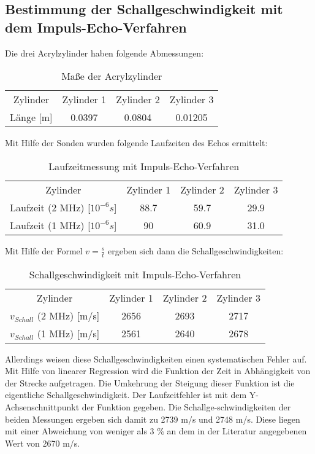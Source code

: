 \documentclass[11pt,ngerman,a4paper]{article}
\begin{document}
\subsection{Bestimmung der Schallgeschwindigkeit mit dem Impuls-Echo-Verfahren}
Die drei Acrylzylinder haben folgende Abmessungen:
 \begin{table}[h]
\centering
 \begin{tabular}{|c||c|c|c|}
 Zylinder & Zylinder 1 & Zylinder 2 & Zylinder 3 \\
  Länge [m] & 0.0397 & 0.0804 & 0.01205 \\
 \end{tabular}
\caption{Maße der Acrylzylinder}
\end{table}
\newline Mit Hilfe der Sonden wurden folgende Laufzeiten des Echos ermittelt:
 \begin{table}[h]
\centering
 \begin{tabular}{|c||c|c|c|}
 Zylinder & Zylinder 1 & Zylinder 2 & Zylinder 3 \\
 Laufzeit (2 MHz) [$10^{-6}s$] & 88.7 & 59.7 & 29.9 \\
 Laufzeit (1 MHz) [$10^{-6}s$] & 90  & 60.9 & 31.0 \\
 \end{tabular}
\caption{Laufzeitmessung mit Impuls-Echo-Verfahren}
\end{table}
\newline
Mit Hilfe der Formel $v=\frac{s}{t}$ ergeben sich dann die Schallgeschwindigkeiten:
\begin{table}[h]
\centering
 \begin{tabular}{|c||c|c|c|}
 Zylinder & Zylinder 1 & Zylinder 2 & Zylinder 3 \\
 $v_{Schall}$ (2 MHz) [m/s] & 2656 & 2693 & 2717 \\
 $v_{Schall}$ (1 MHz) [m/s] & 2561  & 2640 & 2678 \\
 \end{tabular}
\caption{Schallgeschwindigkeit mit Impuls-Echo-Verfahren}
\end{table}
\newline
Allerdings weisen diese Schallgeschwindigkeiten einen systematischen Fehler auf. Mit Hilfe von linearer Regression wird die Funktion der Zeit in Abhängigkeit von der Strecke aufgetragen. Die Umkehrung der Steigung dieser Funktion ist die eigentliche Schallgeschwindigkeit. Der Laufzeitfehler ist mit dem Y-Achsenschnittpunkt der Funktion gegeben. Die Schallge-schwindigkeiten der beiden Messungen ergeben sich damit zu 2739 m/s und 2748 m/s.
Diese liegen mit einer Abweichung von weniger als 3 \%  an dem in der Literatur angegebenen Wert von 2670 m/s.
\end{document}
